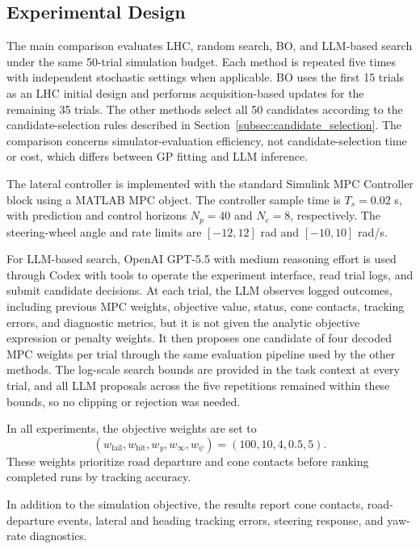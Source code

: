 \documentclass[10pt,twocolumn]{ICCAS}
\begin{document}
\subsection{Experimental Design}
\label{subsec:experimental_design}

The main comparison evaluates LHC, random search, BO, and LLM-based search
under the same 50-trial simulation budget. Each method is repeated five times
with independent stochastic settings when applicable. BO uses the first 15
trials as an LHC initial design and performs acquisition-based updates for the
remaining 35 trials. The other methods select all 50 candidates according to the
candidate-selection rules described in Section~\ref{subsec:candidate_selection}.
The comparison concerns simulator-evaluation efficiency, not candidate-selection
time or cost, which differs between GP fitting and LLM inference.

The lateral controller is implemented with the standard Simulink MPC Controller
block using a MATLAB MPC object. The controller sample time is $T_s=0.02$ s,
with prediction and control horizons $N_p=40$ and $N_c=8$, respectively. The
steering-wheel angle and rate limits are $[-12,12]$ rad and $[-10,10]$ rad/s.

For LLM-based search, OpenAI GPT-5.5 with medium reasoning effort is used
through Codex with tools to operate the experiment interface, read trial logs,
and submit candidate decisions.
At each trial, the LLM observes logged outcomes, including previous MPC weights,
objective value, status, cone contacts, tracking errors, and diagnostic metrics,
but it is not given the analytic objective expression or penalty weights. It
then proposes one candidate of four decoded MPC weights per trial through the
same evaluation pipeline used by the other methods. The log-scale search bounds
are provided in the task context at every trial, and all LLM proposals across
the five repetitions remained within these bounds, so no clipping or rejection
was needed.

In all experiments, the objective weights are set to
\begin{equation}
(w_{\mathrm{fail}},w_{\mathrm{hit}},w_y,w_{\infty},w_\psi)
=
(100,10,4,0.5,5).
\label{eq:objective_weights}
\end{equation}
These weights prioritize road departure and cone contacts before ranking
completed runs by tracking accuracy.

In addition to the simulation objective, the results report cone contacts,
road-departure events, lateral and heading tracking errors, steering response,
and yaw-rate diagnostics.
\end{document}
